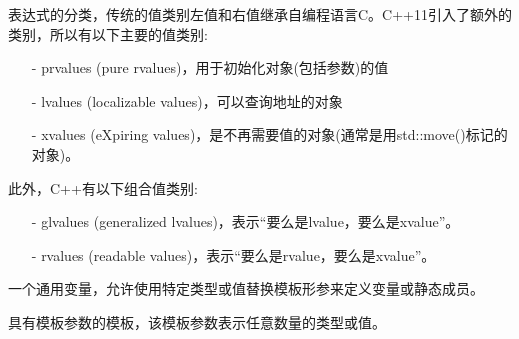 


表达式的分类，传统的值类别左值和右值继承自编程语言C。C++11引入了额外的类别，所以有以下主要的值类别:

\begin{itemize}
\item [-]
prvalues (pure rvalues)，用于初始化对象(包括参数)的值

\item [-]
lvalues (localizable values)，可以查询地址的对象

\item [-]
xvalues (eXpiring values)，是不再需要值的对象(通常是用std::move()标记的对象)。
\end{itemize}

此外，C++有以下组合值类别:

\begin{itemize}
\item [-]
glvalues (generalized lvalues)，表示“要么是lvalue，要么是xvalue”。

\item [-]
rvalues (readable values)，表示“要么是rvalue，要么是xvalue”。
\end{itemize}


一个通用变量，允许使用特定类型或值替换模板形参来定义变量或静态成员。



具有模板参数的模板，该模板参数表示任意数量的类型或值。












